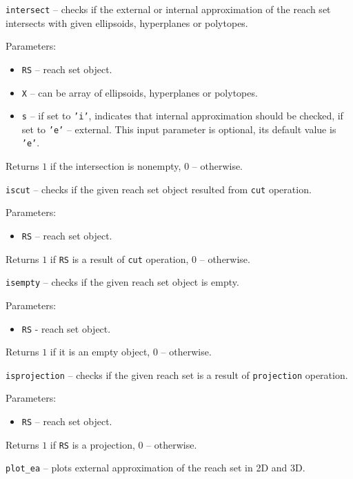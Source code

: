 {\Large {\tt intersect}} -- checks if the external or internal approximation
of the reach set intersects with given ellipsoids, hyperplanes or
polytopes.

Parameters:
\begin{itemize}
\item {\tt RS} -- reach set object.
\item {\tt X} -- can be array of ellipsoids, hyperplanes or polytopes.
\item {\tt s} -- if set to {\tt 'i'}, indicates that internal approximation
should be checked, if set to {\tt 'e'} -- external. This input parameter
is optional, its default value is {\tt 'e'}.
\end{itemize}

Returns $1$ if the intersection is nonempty, $0$ -- otherwise.

\newpage

{\Large {\tt iscut}} -- checks if the given reach set object resulted
from {\tt cut} operation.

Parameters:
\begin{itemize}
\item {\tt RS} -- reach set object.
\end{itemize}

Returns $1$ if {\tt RS} is a result of {\tt cut} operation, $0$ -- otherwise.

\newpage

{\Large {\tt isempty}} -- checks if the given reach set object is empty.

Parameters:
\begin{itemize}
\item {\tt RS} - reach set object.
\end{itemize}

Returns $1$ if it is an empty object, $0$ -- otherwise.

\newpage

{\Large {\tt isprojection}} -- checks if the given reach set is a result
of {\tt projection} operation.

Parameters:
\begin{itemize}
\item {\tt RS} -- reach set object.
\end{itemize}

Returns $1$ if {\tt RS} is a projection, $0$ -- otherwise.

\newpage

{\Large {\tt plot\_ea}} -- plots external approximation of the reach set
in 2D and 3D.

